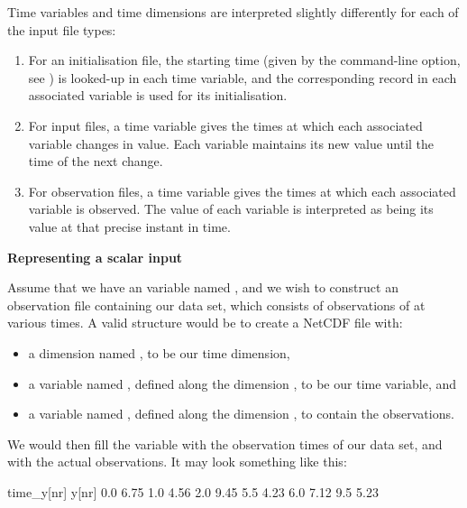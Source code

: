 Time variables and time dimensions are interpreted slightly differently for
each of the input file types:
\begin{enumerate}
\item For an initialisation file, the starting time (given by the 
  command-line option, see ) is looked-up in each time
  variable, and the corresponding record in each associated variable is used
  for its initialisation.
\item For input files, a time variable gives the times at which each
  associated variable changes in value. Each variable maintains its new
  value until the time of the next change.
\item For observation files, a time variable gives the times at which each
  associated variable is observed. The value of each variable is interpreted
  as being its value at that precise instant in time.
\end{enumerate}

\begin{example}
\noindent \textbf{Representing a scalar input}

Assume that we have an  variable named , and we wish to
construct an observation file containing our data set, which consists of
observations of  at various times. A valid structure would be to
create a NetCDF file with:
\begin{itemize}
\item a dimension named , to be our time dimension,
\item a variable named , defined along the dimension ,
  to be our time variable, and
\item a variable named , defined along the dimension , to
  contain the observations.
\end{itemize}
We would then fill the variable  with the observation times of
our data set, and  with the actual observations. It may look something
like this:

\begin{cmdcode}
time_y[nr]    y[nr]
       0.0     6.75
       1.0     4.56
       2.0     9.45
       5.5     4.23
       6.0     7.12
       9.5     5.23
\end{cmdcode}

\end{example}


